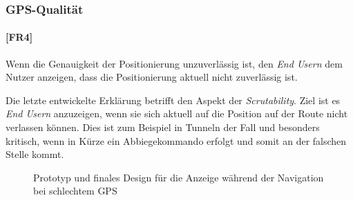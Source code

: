 \subsubsection{GPS-Qualität}
\label{sec:gps_accuracy_definition}

\paragraph{[FR4]} Wenn die Genauigkeit der Positionierung unzuverlässig ist, den \textit{End Usern} dem Nutzer anzeigen, dass die Positionierung aktuell nicht zuverlässig ist.

Die letzte entwickelte Erklärung betrifft den Aspekt der \textit{Scrutability}. Ziel ist es \textit{End Usern} anzuzeigen, wenn sie sich aktuell auf die Position auf der Route nicht verlassen können. Dies ist zum Beispiel in Tunneln der Fall und besonders kritisch, wenn in Kürze ein Abbiegekommando erfolgt und somit an der falschen Stelle kommt.

\begin{figure}[htb!]
    \centering
    \hspace{.055\linewidth}
    \caption{Prototyp und finales Design für die Anzeige während der Navigation bei schlechtem GPS}
    \label{fig:prototype_position_accuracy}
\end{figure}

